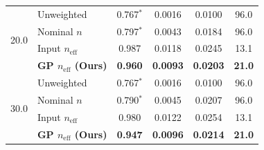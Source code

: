 \begin{table}[!htbp]
{\begin{tabular}{@{}llcccc@{}}
\midrule
\multirow{4}{*}{20.0} 
& Unweighted         & 0.767$^*$ & 0.0016 & 0.0100 & 96.0 \\
& Nominal $n$        & 0.797$^*$ & 0.0043 & 0.0184 & 96.0 \\
& Input $n_{\mathrm{eff}}$ & 0.987     & 0.0118 & 0.0245 & 13.1 \\
& \textbf{GP $n_{\mathrm{eff}}$ (Ours)} & \textbf{0.960} & \textbf{0.0093} & \textbf{0.0203} & \textbf{21.0} \\
\midrule
\multirow{4}{*}{30.0} 
& Unweighted         & 0.767$^*$ & 0.0016 & 0.0100 & 96.0 \\
& Nominal $n$        & 0.790$^*$ & 0.0045 & 0.0207 & 96.0 \\
& Input $n_{\mathrm{eff}}$ & 0.980     & 0.0122 & 0.0254 & 13.1 \\
& \textbf{GP $n_{\mathrm{eff}}$ (Ours)} & \textbf{0.947} & \textbf{0.0096} & \textbf{0.0214} & \textbf{21.0} \\
\bottomrule
\end{tabular}}
\end{table}